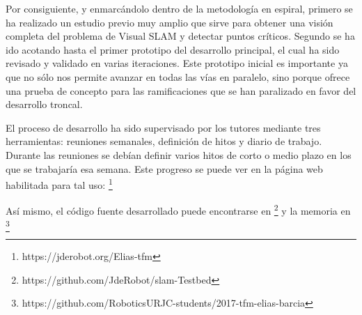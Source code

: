 Por consiguiente, y enmarcándolo dentro de la metodología en espiral, primero se ha realizado un estudio previo muy amplio que sirve para obtener una visión completa del problema de Visual SLAM y detectar puntos críticos. Segundo se ha ido acotando hasta el primer prototipo del desarrollo principal, el cual ha sido revisado y validado en varias iteraciones. Este prototipo inicial es importante ya que no sólo nos permite avanzar en todas las vías en paralelo, sino porque ofrece una prueba de concepto para las ramificaciones que se han paralizado en favor del desarrollo troncal.

El proceso de desarrollo ha sido supervisado por los tutores mediante tres herramientas: reuniones semanales, definición de hitos y diario de trabajo.
Durante las reuniones se debían definir varios hitos de corto o medio plazo en los que se trabajaría esa semana. Este progreso se puede ver en la página web habilitada para tal uso:
\footnote{https://jderobot.org/Elias-tfm}

Así mismo, el código fuente desarrollado puede encontrarse en \footnote{https://github.com/JdeRobot/slam-Testbed} y la memoria en \footnote{https://github.com/RoboticsURJC-students/2017-tfm-elias-barcia}

\clearpage
\newpage
\pagebreak


